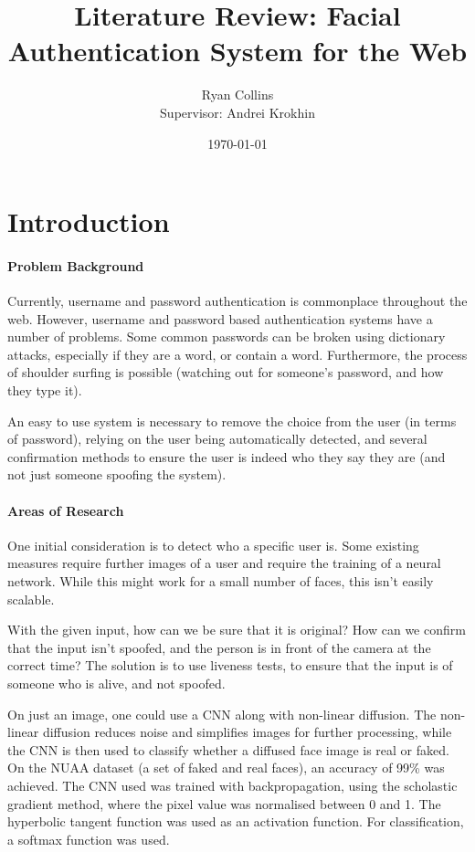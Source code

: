 \documentclass[14pt]{article}
\title{Literature Review: Facial Authentication System for the Web}
\author{
        Ryan Collins\\
        Supervisor: Andrei Krokhin
}
\date{\today}
\begin{document}
\maketitle

\section{Introduction}
\paragraph{Problem Background}
Currently, username and password authentication is commonplace throughout the web. However, username and password
based authentication systems have a number of problems. Some common passwords can be broken using dictionary attacks,
especially if they are a word, or contain a word. Furthermore, the process of shoulder surfing is possible (watching out
for someone's password, and how they type it).

An easy to use system is necessary to remove the choice from the user (in terms of password), relying on the user being automatically
detected, and several confirmation methods to ensure the user is indeed who they say they are (and not just someone spoofing the system).

\paragraph{Areas of Research}
One initial consideration is to detect who a specific user is. Some existing measures require further images of a user
and require the training of a neural network. While this might work for a small number of faces, this isn't easily scalable.

With the given input, how can we be sure that it is original? How can we confirm that the input isn't spoofed,
and the person is in front of the camera at the correct time? The solution is to use liveness tests, to ensure
that the input is of someone who is alive, and not spoofed. 

On just an image, one could use a CNN along with non-linear diffusion. The non-linear diffusion reduces noise and
simplifies images for further processing, while the CNN is then used to classify whether a diffused face image
is real or faked. On the NUAA dataset (a set of faked and real faces), an accuracy of 99\% was achieved. The CNN
used was trained with backpropagation, using the scholastic gradient method, where the pixel value was normalised between
0 and 1. The hyperbolic tangent function was used as an activation function. For classification, a softmax function was
used. 
\cite{LivenessTestNonLinearDiffusion}
\end{document}
